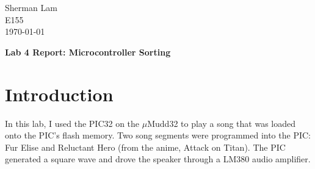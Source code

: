 \documentclass[11pt]{article}
\begin{document}
\begin{flushleft}
Sherman Lam
\\E155
\\ \today
\end{flushleft}


\begin{center}
\begin{Large}
\textbf{Lab 4 Report: Microcontroller Sorting}
\end{Large}
\end{center}




\section{Introduction}
\label{sec:intro}

In this lab, I used the PIC32 on the $\mu$Mudd32 to play a song that was loaded onto the PIC's flash memory. Two song segments were programmed into the PIC: Fur Elise and Reluctant Hero (from the anime, Attack on Titan). The PIC generated a square wave and drove the speaker through a LM380 audio amplifier.
\end{document}
